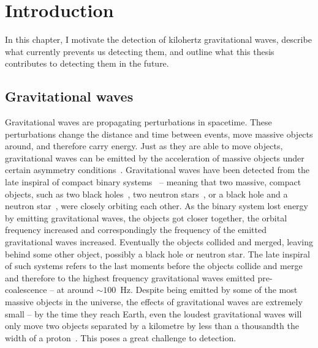 \chapter{Introduction} %





In this chapter, I motivate the detection of kilohertz gravitational waves, describe what currently prevents us detecting them, and outline what this thesis contributes to detecting them in the future.

\section{Gravitational waves}
\label{sec:gravWaves}

Gravitational waves are propagating perturbations in spacetime.
These perturbations change the distance and time between events, move massive objects around, and therefore carry energy. 
Just as they are able to move objects, gravitational waves can be emitted by the acceleration of massive objects under certain asymmetry conditions~\cite{}.
Gravitational waves have been detected from the late inspiral of compact binary systems~\cite{} -- meaning that two massive, compact objects, such as two black holes~\cite{}, two neutron stars~\cite{}, or a black hole and a neutron star~\cite{}, were closely orbiting each other. As the binary system lost energy by emitting gravitational waves, the objects got closer together, the orbital frequency increased and correspondingly the frequency of the emitted gravitational waves increased. Eventually the objects collided and merged, leaving behind some other object, possibly a black hole or neutron star. The late inspiral of such systems refers to the last moments before the objects collide and merge and therefore to the highest frequency gravitational waves emitted pre-coalescence -- at around $\sim 100$~Hz. %
Despite being emitted by some of the most massive objects in the universe, the effects of gravitational waves are extremely small -- by the time they reach Earth, even the loudest gravitational waves will only move two objects separated by a kilometre by less than a thousandth the width of a proton~\cite{}. %
This poses a great challenge to detection.

